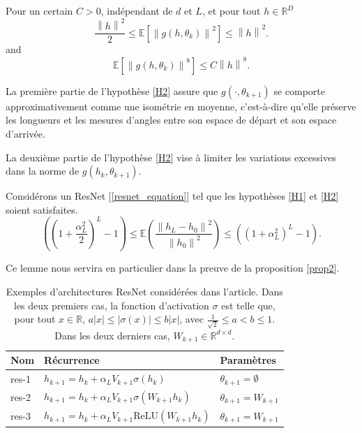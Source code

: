 \begin{assumption}\label{H2}
    Pour un certain $ C > 0 $, indépendant de $ d $ et $ L $, et pour tout $ h \in \mathbb{R}^D  $ 
    \[
        \frac{\left\| h \right\| ^2}{2 } \leq  \mathbb{E }[ \left\|  g(h, \theta _ k ) \right\| ^2 ] \leq \left\| h \right\| ^2
    .\]
    and
    \[
        \mathbb{E } [\left\| g(h, \theta _k)  \right\| ^8 ]\leq C \left\| h  \right\| ^8
    .\]
\end{assumption}
\begin{note}
    La première partie de l'hypothèse \ref{H2} assure que $g(\cdot, \theta_{k+1})$ se comporte approximativement comme une isométrie en moyenne, c'est-à-dire qu'elle préserve les longueurs et les mesures d'angles entre son espace de départ et son espace d'arrivée.

    La deuxième partie de l'hypothèse \ref{H2} vise à limiter les variations excessives dans la norme de $g(h_k, \theta_{k+1})$.
\end{note}

\begin{lem}[Admis]\label{lem14}
    Considérons un ResNet [\ref{resnet_equation}] tel que les hypothèses \ref{H1} et \ref{H2} soient satisfaites.
    \[
        ((1 + \frac{\alpha _L ^2 }{2 }) ^L - 1) \leq \mathbb{E}( \frac{\left\| h_L - h_0 \right\| ^2 }{\left\| h_0 \right\| ^2}) \leq ((1 + \alpha _L ^2 ) ^L - 1 )
    .\]
\end{lem}
Ce lemme nous servira en particulier dans la preuve de la proposition \ref{prop2}.

\begin{table}[h]
    \centering
    \begin{tabular}{lll}
        \hline
        \textbf{Nom} & \textbf{Récurrence} & \textbf{Paramètres} \\ \hline
        res-1 & \( h_{k+1} = h_k + \alpha_L V_{k+1}\sigma(h_k) \) & \( \theta_{k+1} = \emptyset \) \\
        res-2 & \( h_{k+1} = h_k + \alpha_L V_{k+1}\sigma(W_{k+1}h_k) \) & \( \theta_{k+1} = W_{k+1} \) \\
        res-3 & \( h_{k+1} = h_k + \alpha_L V_{k+1}\text{ReLU}(W_{k+1}h_k) \) & \( \theta_{k+1} = W_{k+1} \) \\ \hline
    \end{tabular}
    \caption{Exemples d'architectures ResNet considérées dans l'article. Dans les deux premiers cas, la fonction d'activation \( \sigma \) est telle que, pour tout \( x \in \mathbb{R} \), \( a|x| \leq |\sigma(x)| \leq b|x| \), avec \( \frac{1}{\sqrt{2}} \leq a < b \leq 1 \). Dans les deux derniers cas, \( W_{k+1} \in \mathbb{R}^{d \times d} \).}
    \label{tab:resnet_architectures}
\end{table}

